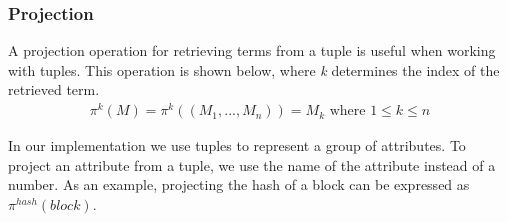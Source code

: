 \subsubsection{Projection}
A projection operation for retrieving terms from a tuple is useful when working with tuples. This operation is shown below, where \textit{k} determines the index of the retrieved term.
\begin{align*}
    \pi^k(M)=\pi^k((M_1,..., M_n))=M_k \text{ where } 1\leq k \leq n
\end{align*}


In our implementation we use tuples to represent a group of attributes. To project an attribute from a tuple, we use the name of the attribute instead of a number. As an example, projecting the hash of a block can be expressed as $\pi^{hash}(block)$.
\FloatBarrier
